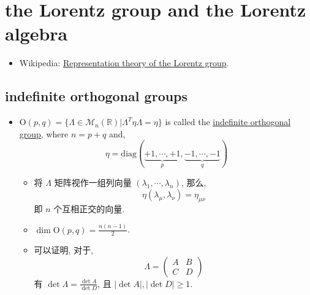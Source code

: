 \chapter{the Lorentz group and the Lorentz algebra} \label{13}
\begin{itemize}
	\item Wikipedia: \href{https://en.wikipedia.org/wiki/Representation_theory_of_the_Lorentz_group}{Representation theory of the Lorentz group}.
\end{itemize}

\section{indefinite orthogonal groups}
\begin{itemize}
	\item $\mathrm{O}(p, q) = \{\Lambda \in \mathcal{M}_n(\mathbb{R}) | \Lambda^T \eta \Lambda = \eta\}$ is called the \href{https://en.wikipedia.org/wiki/Indefinite_orthogonal_group}{indefinite orthogonal group}, where $n = p + q$ and,
	\begin{equation}
		\eta = \mathrm{diag}(\underbrace{+ 1, \cdots, + 1}_{p}, \underbrace{- 1, \cdots, - 1}_{q})
	\end{equation}
	\begin{itemize}
		\item 将 $\Lambda$ 矩阵视作一组列向量 $(\lambda_1, \cdots, \lambda_n)$, 那么,
		\begin{equation}
			\eta(\lambda_\mu, \lambda_\nu) = \eta_{\mu \nu}
		\end{equation}
		即 $n$ 个互相正交的向量.
		
		\item $\dim \mathrm{O}(p, q) = \frac{n (n - 1)}{2}$.
		
		\item 可以证明, 对于,
		\begin{equation}
			\Lambda = \begin{pmatrix}
				A & B \\
				C & D
			\end{pmatrix}
		\end{equation}
		有 $\det \Lambda = \frac{\det A}{\det D}$, 且 $|\det A|, |\det D| \geq 1$.
		

\end{itemize}
\end{itemize}
